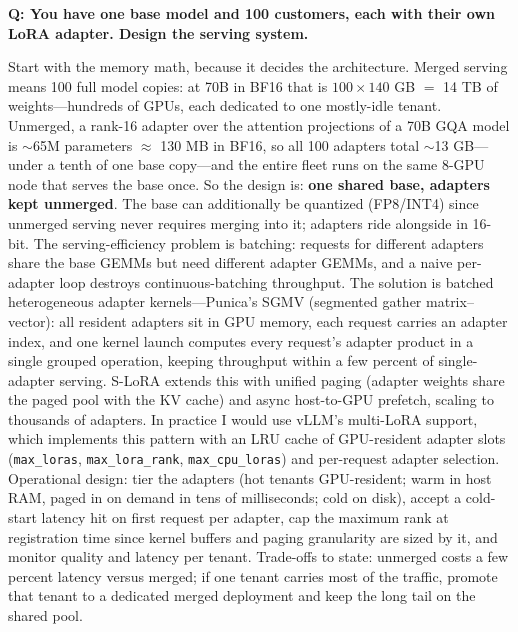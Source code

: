 \begin{interviewq}
\end{interviewq}

\begin{interviewq}
\textbf{Q: You have one base model and 100 customers, each with their own LoRA adapter. Design the serving system.}

 \quad {} \quad \badgefreq{\freqmed}

\stronganswer Start with the memory math, because it decides the architecture. Merged serving means 100 full model copies: at 70B in BF16 that is $100 \times 140$ GB $=$ 14 TB of weights---hundreds of GPUs, each dedicated to one mostly-idle tenant. Unmerged, a rank-16 adapter over the attention projections of a 70B GQA model is $\sim$65M parameters $\approx$ 130 MB in BF16, so all 100 adapters total $\sim$13 GB---under a tenth of one base copy---and the entire fleet runs on the same 8-GPU node that serves the base once. So the design is: \textbf{one shared base, adapters kept unmerged}. The base can additionally be quantized (FP8/INT4) since unmerged serving never requires merging into it; adapters ride alongside in 16-bit. The serving-efficiency problem is batching: requests for different adapters share the base GEMMs but need different adapter GEMMs, and a naive per-adapter loop destroys continuous-batching throughput. The solution is batched heterogeneous adapter kernels---Punica's SGMV (segmented gather matrix--vector): all resident adapters sit in GPU memory, each request carries an adapter index, and one kernel launch computes every request's adapter product in a single grouped operation, keeping throughput within a few percent of single-adapter serving. S-LoRA extends this with unified paging (adapter weights share the paged pool with the KV cache) and async host-to-GPU prefetch, scaling to thousands of adapters. In practice I would use vLLM's multi-LoRA support, which implements this pattern with an LRU cache of GPU-resident adapter slots (\texttt{max\_loras}, \texttt{max\_lora\_rank}, \texttt{max\_cpu\_loras}) and per-request adapter selection. Operational design: tier the adapters (hot tenants GPU-resident; warm in host RAM, paged in on demand in tens of milliseconds; cold on disk), accept a cold-start latency hit on first request per adapter, cap the maximum rank at registration time since kernel buffers and paging granularity are sized by it, and monitor quality and latency per tenant. Trade-offs to state: unmerged costs a few percent latency versus merged; if one tenant carries most of the traffic, promote that tenant to a dedicated merged deployment and keep the long tail on the shared pool.


\end{interviewq}
